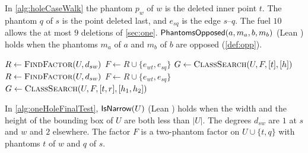 In \cref{alg:holeCaseWalk} the phantom $p_w$ of $w$ is the deleted inner point $t$.
The phantom $q$ of $s$ is the point deleted last, and $e_{sq}$ is the edge $s$--$q$.
The fuel $10$ allows the at most $9$ deletions of \cref{sec:one}.
$\textsf{PhantomsOpposed}(a,m_a,b,m_b)$ (Lean ) holds when the phantoms $m_a$ of $a$ and
$m_b$ of $b$ are opposed (\cref{def:opp}).

\begin{algorithm}[htbp]
\caption{ (Lean ) and
   (Lean )}
\label{alg:oneHoleFinalTest}
\label{alg:twoHoleFinalTest}
\begin{algorithmic}[1]
   \Return \pcfalse
  \EndIf
  \State $R\gets\Call{FindFactor}{U,d_{sw}}$
   \Return \pcfalse
  \EndIf
  \State $F\gets R\cup\{e_{wt},e_{sq}\}$
    \State $G\gets\Call{ClassSearch}{U,F,[t],[h]}$
     \Return \pctrue
    \EndIf
  \EndFor
  \State \Return \pcfalse
\EndFunction
\Statex
{}
   \Return \pcfalse
  \EndIf
  \State $R\gets\Call{FindFactor}{U,d_{sw}}$
   \Return \pcfalse
  \EndIf
  \State $F\gets R\cup\{e_{wt},e_{sq}\}$
      \State $G\gets\Call{ClassSearch}{U,F,[t,r],[h_1,h_2]}$
       \Return \pctrue
      \EndIf
    \EndFor
  \EndFor
  \State \Return \pcfalse
\EndFunction
\end{algorithmic}
\end{algorithm}

In \cref{alg:oneHoleFinalTest}, $\textsf{IsNarrow}(U)$ (Lean ) holds when the width and the
height of the bounding box of $U$ are both less than $|U|$.
The degrees $d_{sw}$ are $1$ at $s$ and $w$ and $2$ elsewhere.
The factor $F$ is a two-phantom factor on $U\cup\{t,q\}$ with phantoms $t$ of $w$ and $q$ of $s$.

